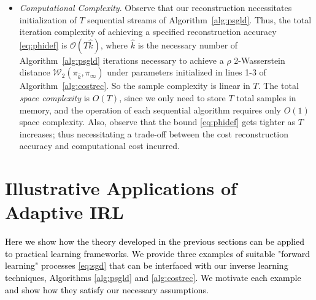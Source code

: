 \documentclass[journal,onecolumn]{IEEEtran}
\newcommand{\wass}{\mathcal{W}_2}
\newcommand{\gibbs}{\ids_{\infty}}
\newcommand{\ids}{\pi}
\newcommand{\wassprox}{\rho}
\newcommand{\snum}{T}
\newcommand{\hk}{\hat{k}}
\begin{document}
\begin{itemize}
{\color{black}However, it should be clear how (S1) and (S2) can be satisfied in practice.}
A necessary condition for (S2) is that one must specify a region $\Theta'$ such that $\int_{\Theta'}d\gibbs(x) \geq \alpha$; \textcolor{black}{then $\Theta$ can simply be constructed by extending the boundary of $\Theta'$ by length $\Delta$}.  \textcolor{black}{A minimal sufficient condition for this is that the inverse learner knows at least one subset of the support of $\gibbs$ with non-zero Lebesgue measure. This immediately implies that $\int_{\Theta'}d\gibbs \geq \alpha$ is satisfied for some $\alpha>0$.} 

\item[-] {\color{black}\textit{Computational Complexity}. Observe that our reconstruction necessitates initialization of $\snum$ sequential streams of Algorithm~\ref{alg:psgld}. Thus, the total iteration complexity of achieving a specified reconstruction accuracy \eqref{eq:phidef} is $\mathcal{O}(\snum\hk)$, where $\hk$ is the necessary number of Algorithm~\ref{alg:psgld} iterations necessary to achieve a $\wassprox$ 2-Wasserstein distance $\wass(\pi_{\hk},\gibbs)$ under parameters initialized in lines 1-3 of Algorithm~\ref{alg:costrec}. So the sample complexity is linear in $\snum$. The total \textit{space complexity} is $O(T)$, since we only need to store $T$ total samples in memory, and the operation of each sequential algorithm requires only $O(1)$ space complexity. Also, observe that the bound \eqref{eq:phidef} gets tighter as $T$ increases; thus necessitating a trade-off between the cost reconstruction accuracy and computational cost incurred.}
\end{itemize}

\section{Illustrative Applications of Adaptive IRL}
\textcolor{black}{Here we show how the theory developed in the previous sections can be applied to practical learning frameworks. We   provide three examples of suitable "forward learning" processes \eqref{eq:sgd} that can be interfaced with our inverse learning techniques, Algorithms \ref{alg:psgld} and \ref{alg:costrec}. We motivate each example and show how they satisfy our necessary assumptions.}
\label{sec:examples}
\end{document}
